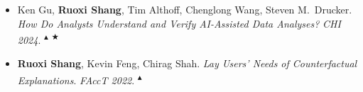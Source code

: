 \documentclass[10pt,a4paper]{article}
\newcommand{\tagRAI}{%
  \textsuperscript{\scriptsize\textcolor{tagpink}{$\blacktriangle$}}%
}
\newcommand{\tagAGENT}{%
  \textsuperscript{\scriptsize\textcolor{tagpink}{$\bigstar$}}%
}
\begin{document}
\begin{itemize}[label={},leftmargin=0em,itemindent=0em,parsep=1pt]
  \item Ken Gu, \textbf{Ruoxi Shang}, Tim Althoff, Chenglong Wang, Steven M.\ Drucker.
  \textit{How Do Analysts Understand and Verify AI-Assisted Data Analyses?}
  \textit{CHI 2024}.\hfill\tagRAI\tagAGENT
  \vspace{8pt}

  \item \textbf{Ruoxi Shang}, Kevin Feng, Chirag Shah.
  \textit{Lay Users' Needs of Counterfactual Explanations}.
  \textit{FAccT 2022}.\hfill\tagRAI
  \vspace{8pt}

\end{itemize}
\end{document}
